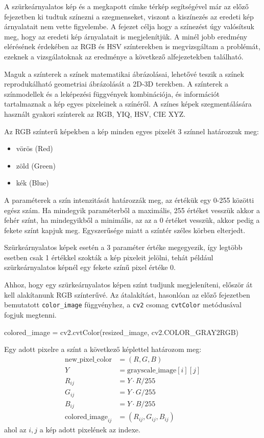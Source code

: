 
A szürkeárnyalatos kép és a megkapott címke térkép segítségével már az előző fejezetben ki tudtuk színezni a szegmenseket, viszont a kiszínezés az eredeti kép árnyalatait nem vette figyelembe. A fejezet célja hogy a színezést úgy valósítsuk meg, hogy az eredeti kép árnyalatait is megjelenítjük. A minél jobb eredmény elérésének érdekében az RGB és HSV színterekben is megvizsgáltam a problémát, ezeknek a vizsgálatoknak az eredménye a következő alfejezetekben található.

Maguk a színterek a színek matematikai ábrázolásai, lehetővé teszik a színek reprodukálható geometriai ábrázolását a 2D-3D terekben. A színterek a színmodellek és a leképezési függvények kombinációja, és információt tartalmaznak a kép egyes pixeleinek a színéről. A színes képek szegmentálására használt gyakori színterek az RGB, YIQ, HSV, CIE XYZ. \cite{colorspaces}


Az RGB színterű képekben a kép minden egyes pixelét 3 színnel határozzuk meg:
\begin{itemize}
\item vörös (Red)
\item zöld (Green)
\item kék (Blue)
\end{itemize}
A paraméterek a szín intenzitását határozzák meg, az értékük egy 0-255 közötti egész szám. Ha mindegyik paraméterből a maximális, 255 értéket vesszük akkor a fehér színt, ha mindegyikből a minimális, az az a 0 értéket vesszük, akkor pedig a fekete színt kapjuk meg.  Egyszerűsége miatt a színtér széles körben elterjedt. \cite{colorspaces}

Szürkeárnyalatos képek esetén a 3 paraméter értéke megegyezik, így legtöbb esetben csak 1 értékkel szokták a kép pixeleit jelölni, tehát például szürkeárnyalatos képnél egy fekete színű pixel értéke 0. 

Ahhoz, hogy egy szürkeárnyalatos képen színt tudjunk megjeleníteni, először át kell alakítanunk RGB színterűvé. Az átalakítást, hasonlóan az előző fejezetben bemutatott \texttt{color\_image} függvényhez, a \texttt{cv2} csomag \texttt{cvtColor} metódusával fogjuk megtenni.
\begin{python}
colored_image = cv2.cvtColor(resized_image, cv2.COLOR_GRAY2RGB)
\end{python}

Egy adott pixelre a színt a következő képlettel határozom meg:
\begin{align*}
 \text{new\_pixel\_color} & = (R, G, B) \\
 Y & = \text{grayscale\_image}[i][j]\\
 R_{ij} & = Y \cdot R / 255 \\
 G_{ij} & = Y \cdot G / 255 \\
 B_{ij} & = Y \cdot B / 255 \\
 \text{colored\_image}_{ij} & = (R_{ij}, G_{ij}, B_{ij})
\end{align*}
\noindent ahol az $i,j$ a kép adott pixelének az indexe.

